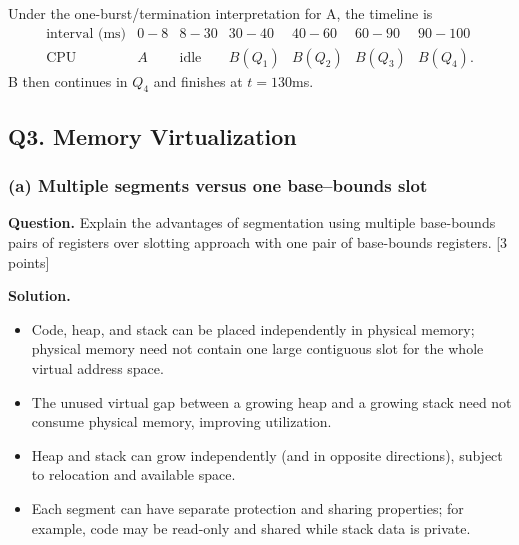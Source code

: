 Under the one-burst/termination interpretation for A, the timeline is
\[
\begin{array}{c|rrrrrr}
\text{interval (ms)}
&0\!-\!8&8\!-\!30&30\!-\!40&40\!-\!60&60\!-\!90&90\!-\!100\\ \hline
\text{CPU}
&A&\text{idle}&B(Q_1)&B(Q_2)&B(Q_3)&B(Q_4).
\end{array}
\]
B then continues in \(Q_4\) and finishes at \(t=130\)ms.

\subsection*{Q3. Memory Virtualization}

\subsubsection*{(a) Multiple segments versus one base--bounds slot}
\textbf{Question.} Explain the advantages of segmentation using multiple
base-bounds pairs of registers over slotting approach with one pair of
base-bounds registers. \hfill [3 points]

\textbf{Solution.}
\begin{itemize}
  \item Code, heap, and stack can be placed independently in physical memory;
        physical memory need not contain one large contiguous slot for the
        whole virtual address space.
  \item The unused virtual gap between a growing heap and a growing stack need
        not consume physical memory, improving utilization.
  \item Heap and stack can grow independently (and in opposite directions),
        subject to relocation and available space.
  \item Each segment can have separate protection and sharing properties; for
        example, code may be read-only and shared while stack data is private.
\end{itemize}

